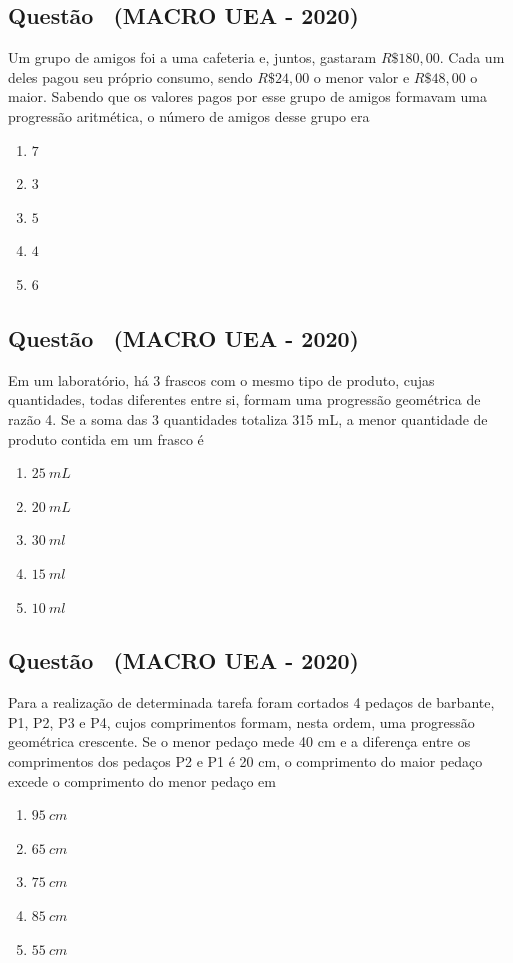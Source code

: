 \documentclass[12pt]{article}
\newcounter{questao}
\newcommand{\novaquestao}[1]{%
  \stepcounter{questao}%
  \subsection*{Questão \thequestao\ (#1)}%
}
\begin{document}
\begin{multicols}{2}
        \novaquestao{MACRO UEA - 2020}
            Um grupo de amigos foi a uma cafeteria e, juntos, gastaram $R\$ 180,00$. Cada um deles pagou seu próprio consumo, sendo $R\$ 24,00$ o menor valor e $R\$ 48,00$ o maior. Sabendo que os valores pagos por esse grupo de amigos formavam uma progressão aritmética, o número de amigos desse grupo era        
        
            \begin{enumerate}[label=\alph*), noitemsep]
                \item $7$
                \item $3$
                \item $5$
                \item $4$
                \item $6$
            \end{enumerate}
        
        \novaquestao{MACRO UEA - 2020}
            Em um laboratório, há 3 frascos com o mesmo tipo de produto, cujas quantidades, todas diferentes entre si, formam uma progressão geométrica de razão 4. Se a soma das 3 quantidades totaliza 315 mL, a menor quantidade de produto contida em um frasco é
        
            \begin{enumerate}[label=(\alph*), noitemsep]
                \item $25\ mL$
                \item $20\ mL$
                \item $30\ ml$
                \item $15\ ml$
                \item $10\ ml$
            \end{enumerate}

        \novaquestao{MACRO UEA - 2020}
        
            Para a realização de determinada tarefa foram cortados 4 pedaços de barbante, P1, P2, P3 e P4, cujos comprimentos formam, nesta ordem, uma progressão geométrica crescente. Se o menor pedaço mede 40 cm e a diferença entre os comprimentos dos pedaços P2 e P1 é 20 cm, o comprimento do maior pedaço excede o comprimento do menor pedaço em

            \begin{enumerate}[label=(\alph*), noitemsep]
                \item $95\ cm$
                \item $65\ cm$
                \item $75\ cm$
                \item $85\ cm$
                \item $55\ cm$
            \end{enumerate}


\end{multicols}
\end{document}

